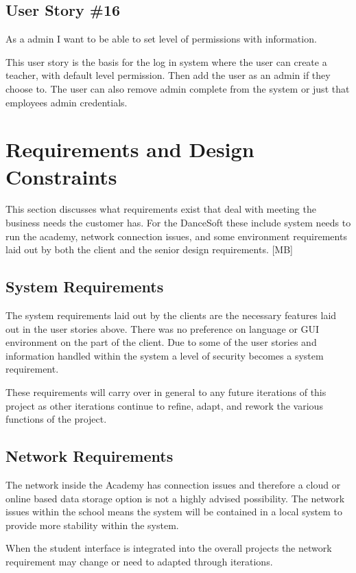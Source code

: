 \subsection{User Story \#16}
As a admin I want to be able to set level of permissions with information.

This user story is the basis for the log in system where the user can create a teacher, with default level permission. Then add the user as an admin if they choose to. The user can also remove admin complete from the system or just that employees admin credentials.

\section{Requirements and Design Constraints}
This section discusses what requirements exist that deal with meeting the business needs the customer has. For the DanceSoft these include system needs to run the academy, network connection issues, and some environment requirements laid out by both the client and the senior design requirements. [MB]


\subsection{System  Requirements}
The system requirements laid out by the clients are the necessary features laid out in the user stories above. There was no preference on language or GUI environment on the part of the client. Due to some of the user stories and information handled within the system a level of security becomes a system requirement.

These requirements will carry over in general to any future iterations of this project as other iterations continue to refine, adapt, and rework the various functions of the project.  

\subsection{Network Requirements}
The network inside the Academy has connection issues and therefore a cloud or online based data storage option is not a highly advised possibility. The network issues within the school means the system will be contained in a local system to provide more stability within the system.

When the student interface is integrated into the overall projects the network requirement may change or need to adapted through iterations.


